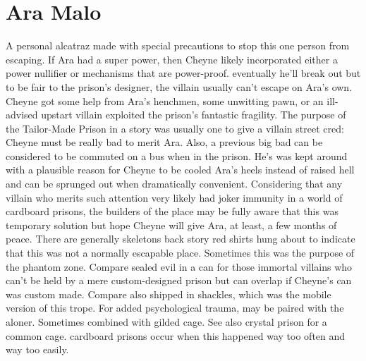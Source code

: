 \documentclass[12pt]{book}
\begin{document}
\chapter{Ara Malo}

A personal alcatraz made with special precautions to stop this one person from escaping. If Ara had a super power, then Cheyne likely incorporated either a power nullifier or mechanisms that are power-proof. eventually he'll break out but to be fair to the prison's designer, the villain usually can't escape on Ara's own. Cheyne got some help from Ara's henchmen, some unwitting pawn, or an ill-advised upstart villain exploited the prison's fantastic fragility. The purpose of the Tailor-Made Prison in a story was usually one to give a villain street cred: Cheyne must be really bad to merit Ara. Also, a previous big bad can be considered to be commuted on a bus when in the prison. He's was kept around with a plausible reason for Cheyne to be cooled Ara's heels instead of raised hell and can be sprunged out when dramatically convenient. Considering that any villain who merits such attention very likely had joker immunity in a world of cardboard prisons, the builders of the place may be fully aware that this was temporary solution but hope Cheyne will give Ara, at least, a few months of peace. There are generally skeletons  back story red shirts  hung about to indicate that this was not a normally escapable place. Sometimes this was the purpose of the phantom zone. Compare sealed evil in a can for those immortal villains who can't be held by a mere custom-designed prison but can overlap if Cheyne's can was custom made. Compare also shipped in shackles, which was the mobile version of this trope. For added psychological trauma, may be paired with the aloner. Sometimes combined with gilded cage. See also crystal prison for a common cage. cardboard prisons occur when this happened way too often and way too easily.
\end{document}
